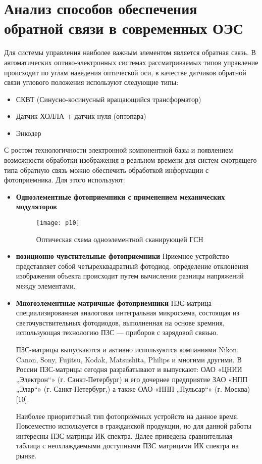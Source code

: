 \section{Анализ способов обеспечения обратной связи в современных ОЭС} \label{sec:ch1/sec3-}

Для системы управления наиболее важным элементом является обратная связь. В автоматических оптико-электронных системах рассматриваемых типов управление происходит по углам наведения оптической оси, в качестве датчиков обратной связи углового положения используют следующие типы:
\begin{itemize}
	\item СКВТ (Синусно-косинусный вращающийся трансформатор)
	\item Датчик ХОЛЛА + датчик нуля (оптопара)
	\item Энкодер
\end{itemize}
С ростом технологичности электронной компонентной базы и появлением возможности обработки изображения в реальном времени для систем смотрящего типа обратную связь можно обеспечить обработкой информации с фотоприемника. Для этого используют:

\begin{itemize}
	\item \textbf{Одноэлементные фотоприемники с применением механических модуляторов}
	\begin{figure}[ht]
		\texttt{[image: p10]} 
		\caption{Оптическая схема одноэлементной сканирующей ГСН  }
		\label{fig:p10}
	\end{figure}
	\item \textbf{позиционно чувстительные фотоприемники}
	Приемное устройство представляет собой четырехквадратный фотодиод. определение отклонения изображения объекта происходит путем вычисления разницы напряжений между элементами. 
	\item \textbf{Многоэлементные матричные фотоприемники}
	ПЗС-матрица — специализированная аналоговая интегральная микросхема, состоящая из светочувствительных фотодиодов, выполненная на основе кремния, использующая технологию ПЗС — приборов с зарядовой связью.
	
	ПЗС-матрицы выпускаются и активно используются компаниями Nikon, Canon, Sony, Fujitsu, Kodak, Matsushita, Philips и многими другими. В России ПЗС-матрицы сегодня разрабатывают и выпускают: ОАО «ЦНИИ „Электрон“» (г. Санкт-Петербург) и его дочернее предприятие ЗАО «НПП „Элар“» (г. Санкт-Петербург,) а также ОАО «НПП „Пульсар“» (г. Москва) [10].
	
	Наиболее приоритетный тип фотоприёмных устройств на данное время. Повсеместно используется в гражданской продукции, но для данной работы интересны ПЗС матрицы ИК спектра. Далее приведена сравнительная таблица с неохлаждаемыми доступными ПЗС матрицами ИК спектра на рынке.
	
\end{itemize}



